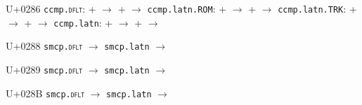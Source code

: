 \documentclass{article}
\begin{document}
\begin{substitutions}
U+0286  \linebreak
    \texttt{ccmp.\textsc{dflt}}:
\linebreak\null\quad{} \space +  \space $\to$  
\linebreak\null\quad{} \space +  \space $\to$  
\linebreak
\texttt{ccmp.latn.ROM}:
\linebreak\null\quad{} \space +  \space $\to$  
\linebreak\null\quad{} \space +  \space $\to$  
\linebreak
\texttt{ccmp.latn.TRK}:
\linebreak\null\quad{} \space +  \space $\to$  
\linebreak\null\quad{} \space +  \space $\to$  
\linebreak
\texttt{ccmp.latn}:
\linebreak\null\quad{} \space +  \space $\to$  
\linebreak\null\quad{} \space +  \space $\to$  


\goodbreak

U+0288  \linebreak
    \texttt{smcp.\textsc{dflt}} $\to$  \linebreak
    \texttt{smcp.latn} $\to$  

\goodbreak

U+0289  \linebreak
    \texttt{smcp.\textsc{dflt}} $\to$  \linebreak
    \texttt{smcp.latn} $\to$  

\goodbreak

U+028B  \linebreak
    \texttt{smcp.\textsc{dflt}} $\to$  \linebreak
    \texttt{smcp.latn} $\to$  

\goodbreak


\end{substitutions}
\end{document}
